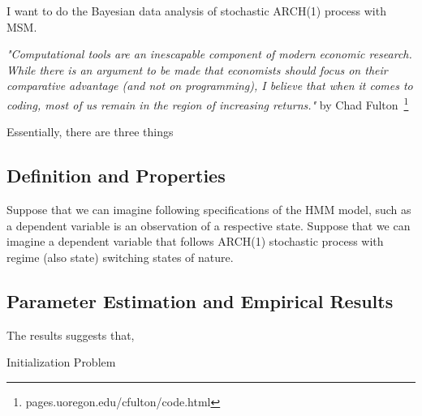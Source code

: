 \documentclass[a4paper,11pt,english]{article}
\begin{document}
		I want to do the Bayesian data analysis of stochastic ARCH(1) process with MSM. \vskip 0.3cm 
		
		
		\noindent \emph{"Computational tools are an inescapable component of modern economic research. While there is an argument to be made that 
		economists should focus on their comparative advantage (and not on programming), I believe that when it comes to coding, most of us remain in the 
		region of increasing returns."} by Chad Fulton~\footnote{pages.uoregon.edu/cfulton/code.html} \vskip 0.3cm 	

	    Essentially, there are three things
		
		
		\subsection{Definition and Properties}
		
		Suppose that we can imagine following specifications of the HMM model, such as a dependent variable is an observation of a respective state.
		Suppose that we can imagine a dependent variable that follows ARCH(1) stochastic process with regime (also state) switching states of nature.

		\subsection{Parameter Estimation and Empirical Results}
		
		
		The results suggests that, 
		
		Initialization Problem		
\end{document}
